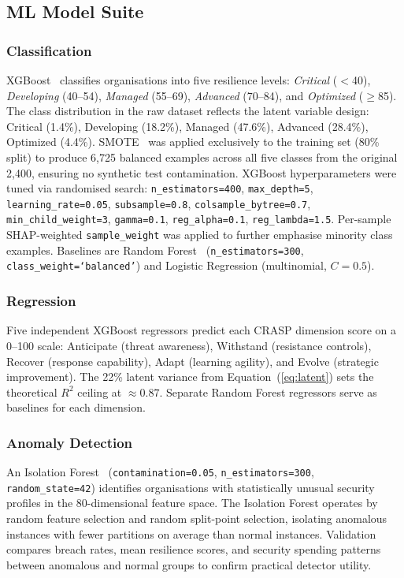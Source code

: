 \documentclass[journal]{IEEEtran}
\begin{document}
\subsection{ML Model Suite}

\subsubsection{Classification}
XGBoost~\cite{chen2016xgboost} classifies organisations into five resilience
levels: \emph{Critical} ($<$40), \emph{Developing} (40--54),
\emph{Managed} (55--69), \emph{Advanced} (70--84), and \emph{Optimized}
($\geq$85). The class distribution in the raw dataset reflects the latent
variable design: Critical (1.4\%), Developing (18.2\%), Managed (47.6\%),
Advanced (28.4\%), Optimized (4.4\%). SMOTE~\cite{chawla2002smote} was
applied exclusively to the training set (80\% split) to produce 6,725
balanced examples across all five classes from the original 2,400, ensuring
no synthetic test contamination. XGBoost hyperparameters were tuned via
randomised search: \texttt{n\_estimators=400}, \texttt{max\_depth=5},
\texttt{learning\_rate=0.05}, \texttt{subsample=0.8},
\texttt{colsample\_bytree=0.7}, \texttt{min\_child\_weight=3},
\texttt{gamma=0.1}, \texttt{reg\_alpha=0.1}, \texttt{reg\_lambda=1.5}.
Per-sample SHAP-weighted \texttt{sample\_weight} was applied to further
emphasise minority class examples. Baselines are Random
Forest~\cite{breiman2001} (\texttt{n\_estimators=300},
\texttt{class\_weight=`balanced'}) and Logistic Regression (multinomial,
$C = 0.5$).

\subsubsection{Regression}
Five independent XGBoost regressors predict each CRASP dimension score
on a 0--100 scale: Anticipate (threat awareness), Withstand (resistance
controls), Recover (response capability), Adapt (learning agility), and
Evolve (strategic improvement). The 22\% latent variance from
Equation~(\ref{eq:latent}) sets the theoretical $R^2$ ceiling at $\approx 0.87$.
Separate Random Forest regressors serve as baselines for each dimension.

\subsubsection{Anomaly Detection}
An Isolation Forest~\cite{liu2008isolation} (\texttt{contamination=0.05},
\texttt{n\_estimators=300}, \texttt{random\_state=42}) identifies
organisations with statistically unusual security profiles in the 80-dimensional
feature space. The Isolation Forest operates by random feature selection and
random split-point selection, isolating anomalous instances with fewer
partitions on average than normal instances. Validation compares breach rates,
mean resilience scores, and security spending patterns between anomalous and
normal groups to confirm practical detector utility.
\end{document}
